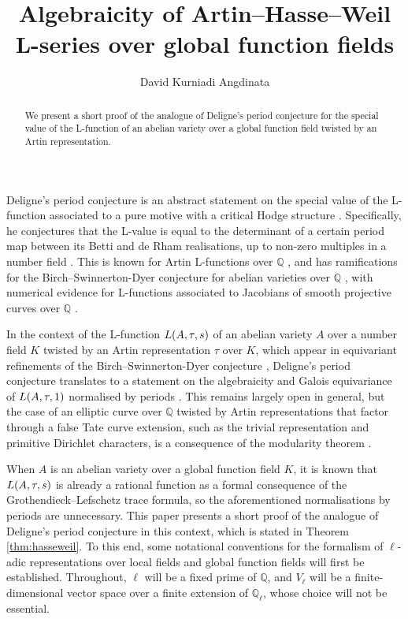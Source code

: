 \documentclass{article}
\title{Algebraicity of Artin--Hasse--Weil L-series over global function fields}
\author{David Kurniadi Angdinata}
\theoremstyle{definition}
\theoremstyle{definition}
\newcommand{\QQ}{\mathbb{Q}}
\newcommand{\br}{\!\del[0]}
\begin{document}
\maketitle

\begin{abstract}
We present a short proof of the analogue of Deligne's period conjecture for the special value of the L-function of an abelian variety over a global function field twisted by an Artin representation.
\end{abstract}

Deligne's period conjecture is an abstract statement on the special value of the L-function associated to a pure motive with a critical Hodge structure \cite[Definition 1.3]{Del79}. Specifically, he conjectures that the L-value is equal to the determinant of a certain period map between its Betti and de Rham realisations, up to non-zero multiples in a number field \cite[Conjecture 2.8]{Del79}. This is known for Artin L-functions over $ \QQ $ \cite[Proposition 6.7]{Del79}, and has ramifications for the Birch--Swinnerton-Dyer conjecture for abelian varieties over $ \QQ $ \cite[Section 4]{Del79}, with numerical evidence for L-functions associated to Jacobians of smooth projective curves over $ \QQ $ \cite[Conjecture 1.1]{ECW24}.

In the context of the L-function $ L\br{A, \tau, s} $ of an abelian variety $ A $ over a number field $ K $ twisted by an Artin representation $ \tau $ over $ K $, which appear in equivariant refinements of the Birch--Swinnerton-Dyer conjecture \cite[Conjecture 3.3]{BC24}, Deligne's period conjecture translates to a statement on the algebraicity and Galois equivariance of $ L\br{A, \tau, 1} $ normalised by periods \cite[Proposition 4.3.8]{Eva21}. This remains largely open in general, but the case of an elliptic curve over $ \QQ $ twisted by Artin representations that factor through a false Tate curve extension, such as the trivial representation and primitive Dirichlet characters, is a consequence of the modularity theorem \cite[Theorem 4.2]{BD07}.

When $ A $ is an abelian variety over a global function field $ K $, it is known that $ L\br{A, \tau, s} $ is already a rational function as a formal consequence of the Grothendieck--Lefschetz trace formula, so the aforementioned normalisations by periods are unnecessary. This paper presents a short proof of the analogue of Deligne's period conjecture in this context, which is stated in Theorem \ref{thm:hasseweil}. To this end, some notational conventions for the formalism of $ \ell $-adic representations over local fields and global function fields will first be established. Throughout, $ \ell $ will be a fixed prime of $ \QQ $, and $ V_\ell $ will be a finite-dimensional vector space over a finite extension of $ \QQ_\ell $, whose choice will not be essential.
\end{document}
